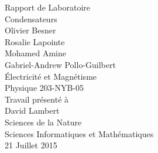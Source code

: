 \begin{titlepage}
\begin{center}
	{\large Rapport de Laboratoire}\\
	{\huge Condensateurs}
	\\[38mm]
	Olivier Besner\\
	Rosalie Lapointe\\
	Mohamed Amine\\
	Gabriel-Andrew Pollo-Guilbert
	\\[38mm]
	Électricité et Magnétisme\\
	Physique 203-NYB-05
	\\[38mm]
	Travail présenté à\\
	David Lambert
	\\[38mm]
	Sciences de la Nature\\
	Sciences Informatiques et Mathématiques\\
	21 Juillet 2015\\
\end{center}
\end{titlepage}

